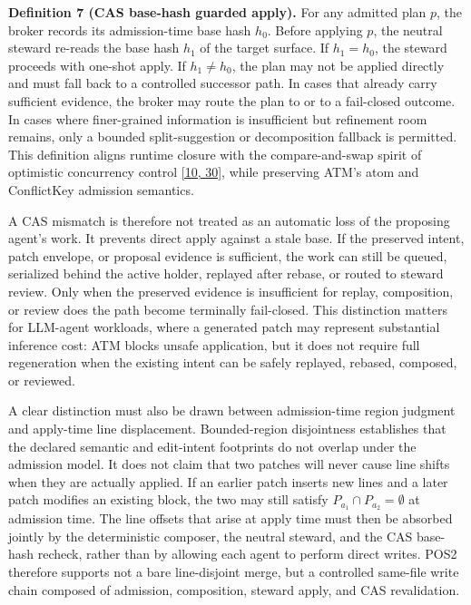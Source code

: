 \documentclass[9pt,letterpaper]{extarticle}
\begin{document}
\textbf{Definition 7 (CAS base-hash guarded apply).} For any admitted plan $p$, the broker records its admission-time base hash $h_0$. Before applying $p$, the neutral steward re-reads the base hash $h_1$ of the target surface. If $h_1 = h_0$, the steward proceeds with one-shot apply. If $h_1 \neq h_0$, the plan may not be applied directly and must fall back to a controlled successor path. In cases that already carry sufficient evidence, the broker may route the plan to \texttt{} or to a fail-closed outcome. In cases where finer-grained information is insufficient but refinement room remains, only a bounded split-suggestion or decomposition fallback is permitted. This definition aligns runtime closure with the compare-and-swap spirit of optimistic concurrency control \textcolor{atmLinkBlue}{\hyperlink{Item.46}{[10, 30]}}, while preserving ATM's atom and ConflictKey admission semantics.

A CAS mismatch is therefore not treated as an automatic loss of the proposing agent's work. It prevents direct apply against a stale base. If the preserved intent, patch envelope, or proposal evidence is sufficient, the work can still be queued, serialized behind the active holder, replayed after rebase, or routed to steward review. Only when the preserved evidence is insufficient for replay, composition, or review does the path become terminally fail-closed. This distinction matters for LLM-agent workloads, where a generated patch may represent substantial inference cost: ATM blocks unsafe application, but it does not require full regeneration when the existing intent can be safely replayed, rebased, composed, or reviewed.

A clear distinction must also be drawn between admission-time region judgment and apply-time line displacement. Bounded-region disjointness establishes that the declared semantic and edit-intent footprints do not overlap under the admission model. It does not claim that two patches will never cause line shifts when they are actually applied. If an earlier patch inserts new lines and a later patch modifies an existing block, the two may still satisfy $P_{a_1} \cap P_{a_2} = \emptyset$ at admission time. The line offsets that arise at apply time must then be absorbed jointly by the deterministic composer, the neutral steward, and the CAS base-hash recheck, rather than by allowing each agent to perform direct writes. POS2 therefore supports not a bare line-disjoint merge, but a controlled same-file write chain composed of admission, composition, steward apply, and CAS revalidation.
\end{document}
